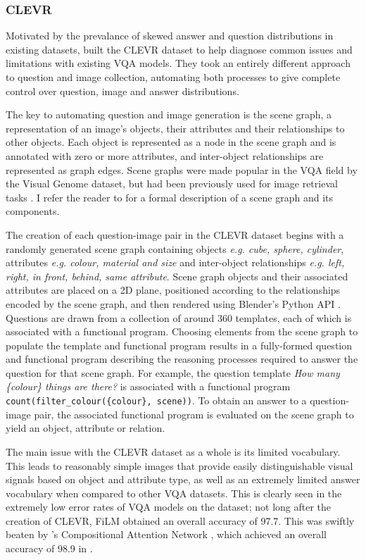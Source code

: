 \subsubsection{CLEVR}
Motivated by the prevalance of skewed answer and question distributions in existing datasets, \citeauthor{johnson2017clevr} built the CLEVR dataset to help diagnose common issues and limitations with existing VQA models. They took an entirely different approach to question and image collection, automating both processes to give complete control over question, image and answer distributions.

The key to automating question and image generation is the scene graph, a representation of an image's objects, their attributes and their relationships to other objects. Each object is represented as a node in the scene graph and is annotated with zero or more attributes, and inter-object relationships are represented as  graph edges. Scene graphs were made popular in the VQA field by the Visual Genome dataset, but had been previously used for image retrieval tasks \cite{johnson2015image}. I refer the reader to \subsectionautorefname{ \ref{subsection:scene_graph_embedding_motivation}} for a formal description of a scene graph and its components.

The creation of each question-image pair in the CLEVR dataset begins with a randomly generated scene graph containing objects \textit{e.g. cube, sphere, cylinder}, attributes \textit{e.g. colour, material and size} and inter-object relationships \textit{e.g. left, right, in front, behind, same attribute}. Scene graph objects and their associated attributes are placed on a 2D plane, positioned according to the relationships encoded by the scene graph, and then rendered using Blender's Python API \cite{blender}. 
Questions are drawn from a collection of around 360 templates, each of which is associated with a functional program. Choosing elements from the scene graph to populate the template and functional program results in a fully-formed question and functional program describing the reasoning processes required to answer the question for that scene graph. For example, the question template \textit{How many \{colour\} things are there?} is associated with a functional program \texttt{count(filter\_colour(\{colour\}, scene))}. To obtain an answer to a question-image pair, the associated functional program is evaluated on the scene graph to yield an object, attribute or relation.

The main issue with the CLEVR dataset as a whole is its limited vocabulary. This leads to reasonably simple images that provide easily distinguishable visual signals based on object and attribute type, as well as an extremely limited answer vocabulary when compared to other VQA datasets. This is clearly seen in the extremely low error rates of VQA models on the dataset; not long after the creation of CLEVR, FiLM \cite{perez2017film} obtained an overall accuracy of 97.7. This was swiftly beaten by \citeauthor{hudson2018compositional}'s Compositional Attention Network \cite{hudson2018compositional}, which achieved an overall accuracy of 98.9 in \citeyear{hudson2018compositional}.

